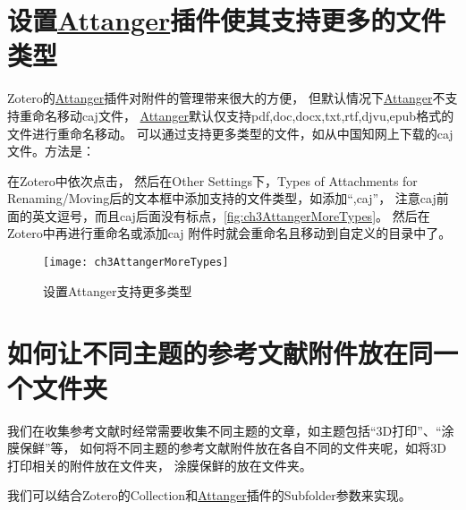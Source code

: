 \documentclass[theorem=false,mathfont=none,openany,sub3section]{easybook}
\begin{document}
\section{设置\href{https://github.com/MuiseDestiny/zotero-attanger}{Attanger}插件使其支持更多的文件类型}\label{sec:zotFile_more_filetype}
\quad \quad Zotero的\href{https://github.com/MuiseDestiny/zotero-attanger}{Attanger}插件对附件的管理带来很大的方便，
但默认情况下\href{https://github.com/MuiseDestiny/zotero-attanger}{Attanger}不支持重命名移动caj文件，
\href{https://github.com/MuiseDestiny/zotero-attanger}{Attanger}默认仅支持pdf,doc,docx,txt,rtf,djvu,epub格式的文件进行重命名移动。
可以通过支持更多类型的文件，如从中国知网上下载的caj文件。方法是：

\quad \quad 在Zotero中依次点击，
然后在Other Settings下，Types of Attachments for Renaming/Moving后的文本框中添加支持的文件类型，如添加“,caj”，
注意caj前面的英文逗号，而且caj后面没有标点，\autoref{fig:ch3AttangerMoreTypes}。
然后在Zotero中再进行重命名或添加caj
附件时就会重命名且移动到自定义的目录中了。


\begin{figure}[htbp]
	\centering
	\texttt{[image: ch3AttangerMoreTypes]}
	\caption{设置Attanger支持更多类型}
	\label{fig:ch3AttangerMoreTypes}
\end{figure}

\section{如何让不同主题的参考文献附件放在同一个文件夹}\label{sec:Attanger_dif_sub_folder}

我们在收集参考文献时经常需要收集不同主题的文章，如主题包括“3D打印”、“涂膜保鲜”等，
如何将不同主题的参考文献附件放在各自不同的文件夹呢，如将3D打印相关的附件放在文件夹，
涂膜保鲜的放在文件夹。

我们可以结合Zotero的Collection和\href{https://github.com/MuiseDestiny/zotero-attanger}{Attanger}插件的Subfolder参数来实现。
\end{document}
